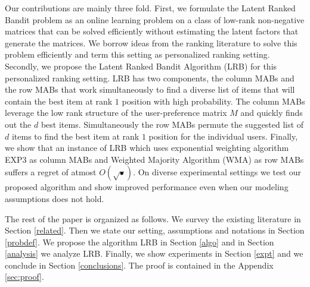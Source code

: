 Our contributions are mainly three fold. First, we formulate the Latent Ranked Bandit problem as an online learning problem on a class of low-rank non-negative matrices that can be solved efficiently without estimating the latent factors that generate the matrices. We borrow ideas from the ranking literature to solve this problem efficiently and term this setting as personalized ranking setting. Secondly, we propose the Latent Ranked Bandit Algorithm (LRB) for this personalized ranking setting. LRB has two components, the column MABs  and the row MABs that work simultaneously to find a diverse list of items that will contain the best item at rank $1$ position with high probability. The column MABs leverage the low rank structure of the user-preference matrix $M$ and quickly finds out the $d$ best items. Simultaneously the row MABs permute the suggested list of $d$ items to find the best item at rank $1$ position for the individual users. Finally, we show that an instance of LRB which uses exponential weighting algorithm EXP3 as column MABs and Weighted Majority Algorithm (WMA) as row MABs suffers a regret of atmost $O\left(\sqrt{•}\right)$. On diverse experimental settings we test our proposed algorithm and show improved performance even when our modeling assumptions does not hold.

	The rest of the paper is organized as follows. We survey the existing literature in Section \ref{related}. Then we state our setting, assumptions and notations in Section \ref{probdef}. We propose the algorithm LRB in Section \ref{algo} and in Section \ref{analysis} we analyze LRB. Finally, we show experiments in Section \ref{expt} and we conclude in Section \ref{conclusions}. The proof is contained in the Appendix \ref{sec:proof}.